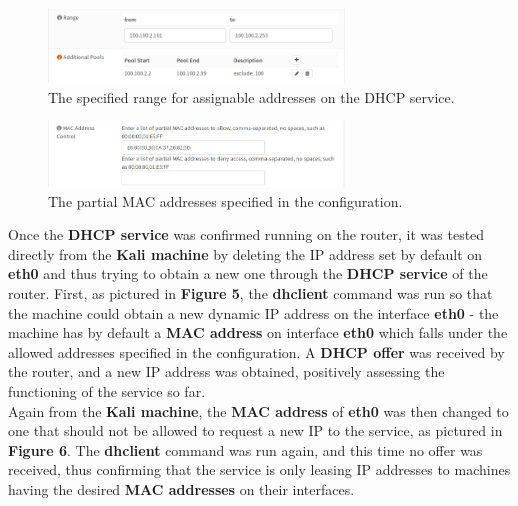\begin{figure}[htpb]
\centering
\includegraphics[width=0.7\textwidth]{dhcp_range.png}
\caption[a]{The specified range for assignable addresses on the DHCP service.}\label{fig:3}
\end{figure}

\begin{figure}[htpb]
\centering
\includegraphics[width=0.7\textwidth]{dhcp_mac_rules.png}
\caption[a]{The partial MAC addresses specified in the configuration.}\label{fig:4}
\end{figure}

Once the \textbf{DHCP service} was confirmed running on the router, it was tested directly from the \textbf{Kali machine} by deleting the IP address set by default on \textbf{eth0} and thus trying to obtain a new one through the \textbf{DHCP service} of the router. First, as pictured in \textbf{Figure 5}, the \textbf{dhclient} command was run so that the machine could obtain a new dynamic IP address on the interface \textbf{eth0} - the machine has by default a \textbf{MAC address} on interface \textbf{eth0} which falls under the allowed addresses specified in the configuration. A \textbf{DHCP offer} was received by the router, and a new IP address was obtained, positively assessing the functioning of the service so far.\\
Again from the \textbf{Kali machine}, the \textbf{MAC address} of \textbf{eth0} was then changed to one that should not be allowed to request a new IP to the service, as pictured in \textbf{Figure 6}. The \textbf{dhclient} command was run again, and this time no offer was received, thus confirming that the service is only leasing IP addresses to machines having the desired \textbf{MAC addresses} on their interfaces.

